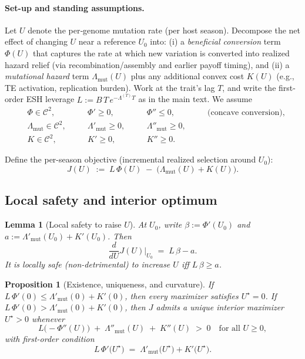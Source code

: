 \documentclass[11pt]{article}
\theoremstyle{upright}
\newtheorem{lemma}{Lemma}
\newtheorem{proposition}{Proposition}
\newcommand{\hazT}[1]{\Lambda^{(#1)}}          %
\begin{document}
\paragraph{Set-up and standing assumptions.}
Let \(U\) denote the per‐genome mutation rate (per host season). Decompose the net effect of changing \(U\)
near a reference \(U_0\) into: (i) a \emph{beneficial conversion} term \(\Phi(U)\) that captures the rate at which
new variation is converted into realized hazard relief (via recombination/assembly and earlier payoff timing),
and (ii) a \emph{mutational hazard} term \(\Lambda_{\mathrm{mut}}(U)\) plus any additional convex cost \(K(U)\)
(e.g., TE activation, replication burden). Work at the trait’s lag \(T\), and write the first-order ESH leverage
\(L:=B\,T\,e^{-\hazT{T}T}\) as in the main text. We assume
\[
\begin{alignedat}{4}
&\Phi \in \mathcal C^2,        &\quad& \Phi' \ge 0,        &\quad& \Phi'' \le 0,        &\quad& \text{(concave conversion)},\\
&\Lambda_{\mathrm{mut}} \in \mathcal C^2, &\quad& \Lambda'_{\mathrm{mut}} \ge 0, &\quad& \Lambda''_{\mathrm{mut}} \ge 0,\\
&K \in \mathcal C^2,            &\quad& K' \ge 0,           &\quad& K'' \ge 0.
\end{alignedat}
\]

Define the per-season objective (incremental realized selection around \(U_0\)):
\begin{equation}
J(U)\;:=\; L\,\Phi(U)\;-\;\big(\Lambda_{\mathrm{mut}}(U)+K(U)\big).
\label{eq:J-U}
\end{equation}

\subsection{Local safety and interior optimum}
\begin{lemma}[Local safety to raise \(U\)]
\label{lem:safe-U}
At \(U_0\), write \(\beta:=\Phi'(U_0)\) and \(a:=\Lambda'_{\mathrm{mut}}(U_0)+K'(U_0)\). Then
\[
\frac{d}{dU}J(U)\Big|_{U_0} \;=\; L\,\beta - a.
\]
It is locally safe (non-detrimental) to increase \(U\) iff \(L\,\beta\ge a\).
\end{lemma}

\begin{proposition}[Existence, uniqueness, and curvature]
\label{prop:exist-uniq}
If \(L\,\Phi'(0)\le \Lambda'_{\mathrm{mut}}(0)+K'(0)\), then every maximizer satisfies \(U^\star=0\).
If \(L\,\Phi'(0)> \Lambda'_{\mathrm{mut}}(0)+K'(0)\), then \(J\) admits a unique interior maximizer \(U^\star>0\) whenever
\[
L\big(-\Phi''(U)\big)\;+\;\Lambda''_{\mathrm{mut}}(U)\;+\;K''(U)\;>\;0\quad\text{for all }U\ge 0,
\]
with first-order condition
\begin{equation}
L\,\Phi'\!\big(U^\star\big) \;=\; \Lambda'_{\mathrm{mut}}\!\big(U^\star\big)+K'\!\big(U^\star\big).
\label{eq:FOC-U}
\end{equation}
\end{proposition}
\end{document}
